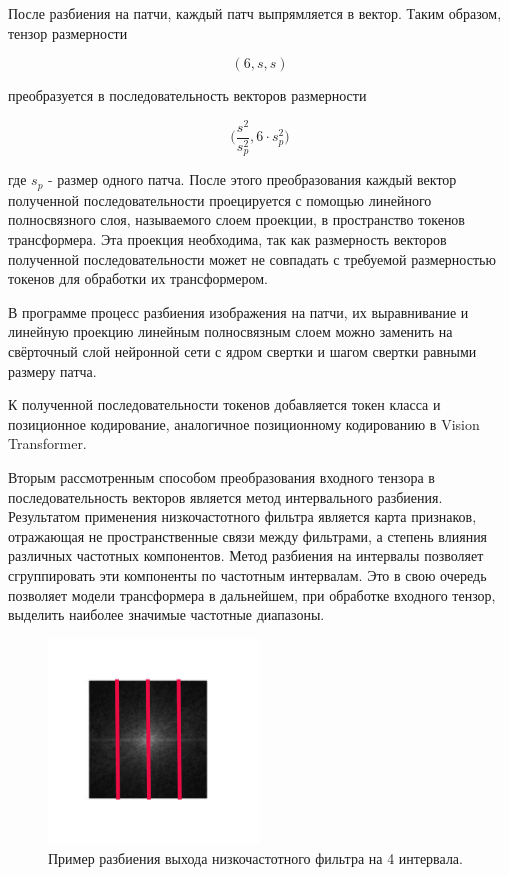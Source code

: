 После разбиения на патчи, каждый патч выпрямляется в вектор. Таким образом, тензор размерности 

$$ (6, s, s)$$ 

преобразуется в последовательность векторов размерности 

$$\Big(\dfrac{s^2}{s_p^2}, 6 \cdot s_p^2\Big)$$ 

где $s_p$ - размер одного патча. После этого преобразования каждый вектор полученной последовательности проецируется с помощью линейного полносвязного слоя, называемого слоем проекции, в пространство токенов трансформера. Эта проекция необходима, так как размерность векторов полученной последовательности может не совпадать с требуемой размерностью токенов для обработки их трансформером. 

В программе процесс разбиения изображения на патчи, их выравнивание и линейную проекцию линейным полносвязным слоем можно заменить на свёрточный слой нейронной сети с ядром свертки и шагом свертки равными размеру патча.

К полученной последовательности токенов добавляется токен класса и позиционное кодирование, аналогичное позиционному кодированию в Vision Transformer.

Вторым рассмотренным способом преобразования входного тензора в последовательность векторов является метод интервального разбиения. Результатом применения низкочастотного фильтра является карта признаков, отражающая не пространственные связи между фильтрами, а степень влияния различных частотных компонентов. Метод разбиения на интервалы позволяет сгруппировать эти компоненты по частотным интервалам. Это в свою очередь позволяет модели трансформера в дальнейшем, при обработке входного тензор, выделить наиболее значимые частотные диапазоны. 

\begin{figure}[H]
    \centering
    \includegraphics[width=0.5\textwidth]
    {images/research/fourier/bins_split.png}
    \caption{Пример разбиения выхода низкочастотного фильтра на 4 интервала.}
\end{figure}

